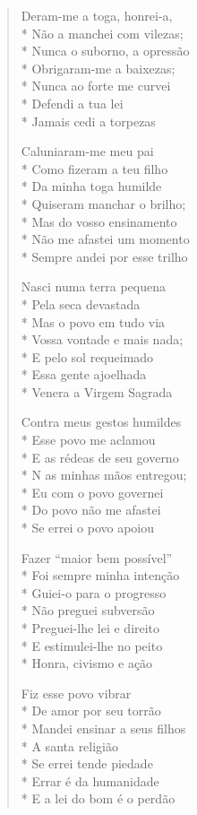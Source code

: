 \begin{verse}
Deram-me a toga, honrei-a,\\*
Não a manchei com vilezas;\\*
Nunca o suborno, a opressão\\*
Obrigaram-me a baixezas;\\*
Nunca ao forte me curvei\\*
Defendi a tua lei\\*
Jamais cedi a torpezas

Caluniaram-me meu pai\\*
Como fizeram a teu filho\\*
Da minha toga humilde\\*
Quiseram manchar o brilho;\\*
Mas do vosso ensinamento\\*
Não me afastei um momento\\*
Sempre andei por esse trilho

Nasci numa terra pequena\\*
Pela seca devastada\\*
Mas o povo em tudo via\\*
Vossa vontade e mais nada;\\*
E pelo sol requeimado\\*
Essa gente ajoelhada\\*
Venera a Virgem Sagrada

Contra meus gestos humildes\\*
Esse povo me aclamou\\*
E as rédeas de seu governo\\*
N as minhas mãos entregou;\\*
Eu com o povo governei\\*
Do povo não me afastei\\*
Se errei o povo apoiou

Fazer ``maior bem possível''\\*
Foi sempre minha intenção\\*
Guiei-o para o progresso\\*
Não preguei subversão\\*
Preguei-lhe lei e direito\\*
E estimulei-lhe no peito\\*
Honra, civismo e ação

Fiz esse povo vibrar\\*
De amor por seu torrão\\*
Mandei ensinar a seus filhos\\*
A santa religião\\*
Se errei tende piedade\\*
Errar é da humanidade\\*
E a lei do bom é o perdão


\end{verse}
